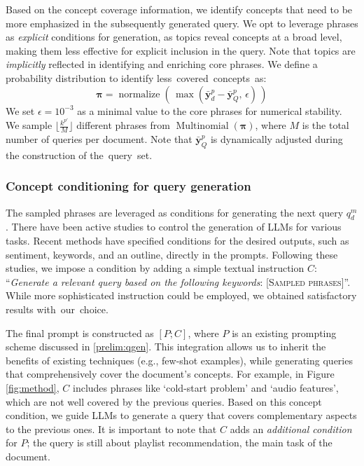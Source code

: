 Based on the concept coverage information, we identify concepts that need to be more emphasized in the subsequently generated query.
We opt to leverage phrases as \textit{explicit} conditions for generation, as topics reveal concepts at a broad level, making them less effective for explicit inclusion in the query.
Note that topics are \textit{implicitly} reflected in identifying and enriching core phrases. 
We define a probability distribution to identify less~covered~concepts~as:
\begin{equation}
    \boldsymbol{\pi} = \operatorname{normalize}(\,\max(\bar{\textbf{y}}^p_d - \bar{\textbf{y}}^p_Q, \,\epsilon)\,)
\end{equation}
We set $\epsilon = 10^{-3}$ as a minimal value to the core phrases for numerical stability.
We sample $\lfloor \frac{k^{p'}}{M} \rfloor$ different phrases from $\operatorname{Multinomial}(\boldsymbol{\pi})$, where $M$ is the total number of queries per document.
Note that $\bar{\textbf{y}}^p_Q$ is dynamically adjusted during the construction of the~query~set.



\subsubsection{\textbf{Concept conditioning for query generation}}
\label{subsub:method_condition}
The sampled phrases are leveraged as conditions for generating the next query $q^m_d$.
There have been active studies to control the generation of LLMs for various tasks. 
Recent methods \cite{control_gen, outline_condition} have specified conditions for the desired outputs, such as sentiment, keywords, and an outline, directly in the prompts.
Following these studies, we impose a condition by adding a simple textual instruction $C$: ``\textit{Generate a relevant query based on the following keywords}: [\textsc{Sampled phrases}]''.
While more sophisticated instruction could be employed, we obtained satisfactory results with~our~choice.


The final prompt is constructed as $[P; C]$, where $P$ is an existing prompting scheme discussed in \cref{prelim:qgen}.
This integration allows us to inherit the benefits of existing techniques (e.g., few-shot examples), while generating queries that comprehensively cover the document's concepts.
For example, in Figure \ref{fig:method}, $C$ includes phrases like `cold-start problem' and `audio features', which are not well covered by the previous queries.
Based on this concept condition, we guide LLMs to generate a query that covers complementary aspects to the previous ones.
It is important to note that $C$ adds an \textit{additional condition} for $P$; the query is still about playlist recommendation, the main task of the document.



